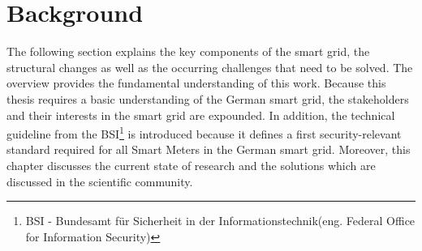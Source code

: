 \chapter{Background}
\label{sec:state}







The following section explains the key components of the smart grid, the structural changes as well as the occurring challenges that need to be solved. The overview provides the fundamental understanding of this work. Because this thesis requires a basic understanding of the German smart grid, the stakeholders and their interests in the smart grid are expounded. In addition, the technical guideline from the \gls{BSI}\footnote[1]{BSI - Bundesamt für Sicherheit in der Informationstechnik(eng. Federal Office for Information Security)} is introduced because it defines a first security-relevant standard required for all Smart Meters in the German smart grid. Moreover, this chapter discusses the current state of research and the solutions which are discussed in the scientific community.\\

